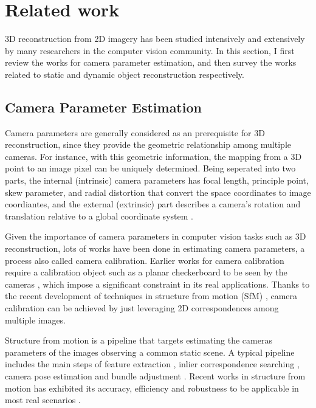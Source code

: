 \chapter{Related work}

3D reconstruction from 2D imagery has been studied intensively and extensively by many researchers in the computer vision community. In this section, I first review the works for camera parameter estimation, and then survey the works related to static and dynamic object reconstruction respectively.

\section{Camera Parameter Estimation}
Camera parameters are generally considered as an prerequisite for 3D reconstruction, since they provide the geometric relationship among multiple cameras. For instance, with this geometric information, the mapping from a 3D point to an image pixel can be uniquely determined.
Being seperated into two parts, the internal (intrinsic) camera parameters has focal length, principle point, skew parameter, and radial distortion that convert the space coordinates to image coordiantes, and the external (extrinsic) part describes a camera's rotation and translation relative to a global coordinate system \cite{Hartley2004}. 

Given the importance of camera parameters in computer vision tasks such as 3D reconstruction, lots of works have been done in estimating camera parameters, a process also called camera calibration. Earlier works for camera calibration require a calibration object such as a planar checkerboard to be seen by the cameras \cite{conf/cvpr/SturmM99,zhang2000flexible,caltoolbox}, which impose a significant constraint in its real applications. Thanks to the recent development of techniques in structure from motion (SfM) \cite{Snavely2,snavely2008modeling,WuVSFM,wilson2013network,heinly2014_duplicate_structure,schoenberger2015paige,Heinly,heinly_dissertation,zheng2015_structureless_resection}, camera calibration can be achieved by just leveraging 2D correspondences among multiple images. 

Structure from motion is a pipeline that targets estimating the cameras parameters of the images observing a common static scene. A typical pipeline includes the main steps of feature extraction \cite{lowe2004_sift,rublee2011_orb,bay2008_surf}, inlier correspondence searching \cite{raguram2013usac}, camera pose estimation \cite{nister2003_five_point,kneip2011novel,zheng2014general,zheng2015_structureless_resection} and bundle adjustment \cite{agarwal2010_ba,wu2011_multicore_ba}. Recent works  in structure from motion has exhibited its accuracy, efficiency and robustness to be applicable in most real scenarios \cite{Snavely2,WuVSFM}.

